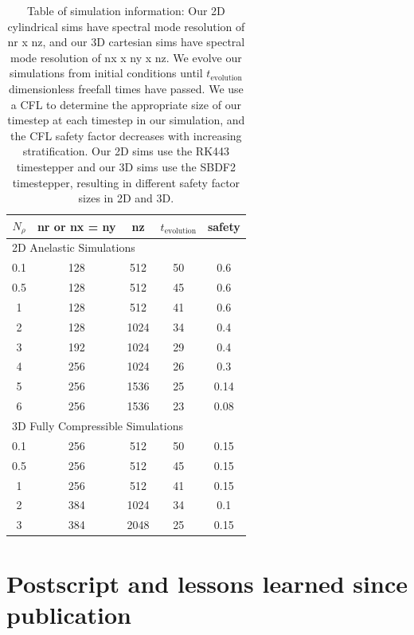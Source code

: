 \begin{table}
\caption[Simulation information for Anders, Lecoanet, \& Brown 2019]{Table of simulation information:
Our 2D cylindrical sims have spectral mode resolution of nr x nz, and our 3D cartesian sims have spectral mode resolution of nx x ny x nz.
We evolve our simulations from initial conditions until $t_{\text{evolution}}$ dimensionless freefall times have passed.
We use a CFL to determine the appropriate size of our timestep at each timestep in our simulation, and the CFL safety factor decreases with increasing stratification.
Our 2D sims use the RK443 timestepper and our 3D sims use the SBDF2 timestepper, resulting in different safety factor sizes in 2D and 3D.
\label{table:simulation_info}
}
\begin{center}
\begin{tabular}{c c c c c }
$N_\rho$ & nr or nx = ny & nz & $t_{\text{evolution}}$ & safety	\\
\hline\hline
\multicolumn{5}{l}{2D Anelastic Simulations}\\
0.1 	& 		128			& 512			& 50 	&	0.6	\\
0.5 	& 		128			& 512			& 45 	&	0.6	\\
1	 	& 		128			& 512			& 41 	&	0.6	\\
2	 	& 		128			& 1024			& 34	&	0.4	\\
3	 	& 		192			& 1024			& 29	&	0.4	\\
4	 	& 		256			& 1024			& 26 	&	0.3	\\
5	 	& 		256			& 1536			& 25 	&	0.14	\\
6	 	& 		256			& 1536			& 23 	&	0.08	\\
\multicolumn{5}{l}{3D Fully Compressible Simulations}\\
0.1 	& 		256			& 512			& 50 		&	0.15	\\
0.5 	& 		256			& 512			& 45 		&	0.15	\\
1	 	& 		256			& 512			& 41	 	&	0.15	\\
2	 	& 		384			& 1024			& 34    	&	0.1	\\
3	 	& 		384			& 2048			& 25    	&	0.15	\\
\hline
\end{tabular}
\end{center}
\end{table}

\section{Postscript and lessons learned since publication}
